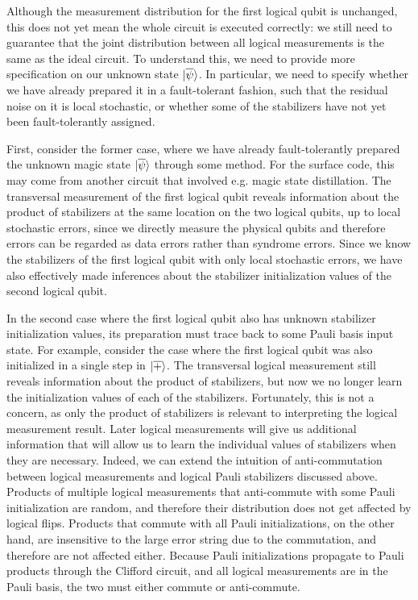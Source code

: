 Although the measurement distribution for the first logical qubit is unchanged, this does not yet mean the whole circuit is executed correctly: we still need to guarantee that the joint distribution between all logical measurements is the same as the ideal circuit.
%
To understand this, we need to provide more specification on our unknown state $|{\overline{\psi}}\rangle$.
%
In particular, we need to specify whether we have already prepared it in a fault-tolerant fashion, such that the residual noise on it is local stochastic, or whether some of the stabilizers have not yet been fault-tolerantly assigned.

First, consider the former case, where we have already fault-tolerantly prepared the unknown magic state $|{\overline{\psi}}\rangle$ through some method.
%
For the surface code, this may come from another circuit that involved e.g. magic state distillation.
%
The transversal measurement of the first logical qubit reveals information about the product of stabilizers at the same location on the two logical qubits, up to local stochastic errors, since we directly measure the physical qubits and therefore errors can be regarded as data errors rather than syndrome errors.
%
Since we know the stabilizers of the first logical qubit with only local stochastic errors, we have also effectively made inferences about the stabilizer initialization values of the second logical qubit.

In the second case where the first logical qubit also has unknown stabilizer initialization values, its preparation must trace back to some Pauli basis input state.
%
For example, consider the case where the first logical qubit was also initialized in a single step in $|{\overline{+}}\rangle$.
%
The transversal logical measurement still reveals information about the product of stabilizers, but now we no longer learn the initialization values of each of the stabilizers.
%
Fortunately, this is not a concern, as only the product of stabilizers is relevant to interpreting the logical measurement result.
%
Later logical measurements will give us additional information that will allow us to learn the individual values of stabilizers when they are necessary.
%
Indeed, we can extend the intuition of anti-commutation between logical measurements and logical Pauli stabilizers discussed above.
%
Products of multiple logical measurements that anti-commute with some Pauli initialization are random, and therefore their distribution does not get affected by logical flips.
%
Products that commute with all Pauli initializations, on the other hand, are insensitive to the large error string due to the commutation, and therefore are not affected either.
%
Because Pauli initializations propagate to Pauli products through the Clifford circuit, and all logical measurements are in the Pauli basis, the two must either commute or anti-commute.

